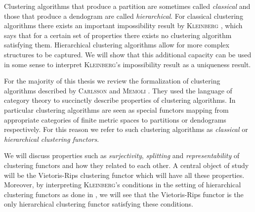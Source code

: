 Clustering algorithms that produce a partition are sometimes called \emph{classical} and those that produce a dendogram are called \emph{hierarchical}.
For classical clustering algorithms there exists an important impossibility result by \textsc{Kleinberg} \cite{Kleinberg2002}, which says that for a certain set of properties there exists no clustering algorithm satisfying them.
Hierarchical clustering algorithms allow for more complex structures to be captured. We will show that this additional capacity can be used in some sense to interpret \textsc{Kleinberg}'s impossibility result as a uniqueness result.

For the majority of this thesis we review the formalization of clustering algorithms described by \textsc{Carlsson} and \textsc{Memoli} \cite{Carlsson2010}. They used the language of category theory to succinctly describe properties of clustering algorithms. In particular clustering algorithms are seen as special functors mapping from appropriate categories of finite metric spaces to partitions or dendograms respectively. For this reason we refer to such clustering algorithms as \emph{classical} or \emph{hierarchical clustering functors}.

We will discuss properties such as \emph{surjectivity}, \emph{splitting} and \emph{representability} of clustering functors and how they related to each other. A central object of study will be the Vietoris-Rips clustering functor which will have all these properties. Moreover, by interpreting \textsc{Kleinberg}'s conditions in the setting of hierarchical clustering functors as done in \cite[Sec.~7.3.1]{Carlsson2010}, we will see that the Vietoris-Rips functor is the only hierarchical clustering functor satisfying these conditions.

